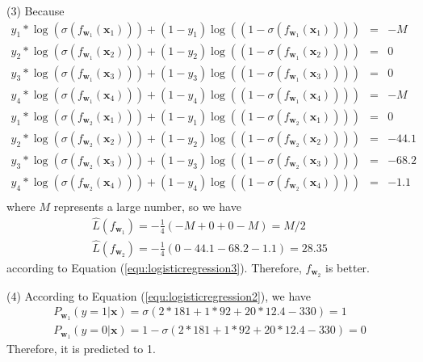 \begin{newanswer*}
(3) Because 
\begin{equation}
\begin{array}{rcl}
    y_1*\log(\sigma(f_{\textbf{w}_1}(\textbf{x}_1)))+(1-y_1)\log((1-\sigma(f_{\textbf{w}_1}(\textbf{x}_1))))&=&-M\\
    y_2*\log(\sigma(f_{\textbf{w}_1}(\textbf{x}_2)))+(1-y_2)\log((1-\sigma(f_{\textbf{w}_1}(\textbf{x}_2))))&=&0\\
    y_3*\log(\sigma(f_{\textbf{w}_1}(\textbf{x}_3)))+(1-y_3)\log((1-\sigma(f_{\textbf{w}_1}(\textbf{x}_3))))&=&0\\
    y_4*\log(\sigma(f_{\textbf{w}_1}(\textbf{x}_4)))+(1-y_4)\log((1-\sigma(f_{\textbf{w}_1}(\textbf{x}_4))))&=&-M\\
    
    y_1*\log(\sigma(f_{\textbf{w}_2}(\textbf{x}_1)))+(1-y_1)\log((1-\sigma(f_{\textbf{w}_2}(\textbf{x}_1))))&=&0\\
    y_2*\log(\sigma(f_{\textbf{w}_2}(\textbf{x}_2)))+(1-y_2)\log((1-\sigma(f_{\textbf{w}_2}(\textbf{x}_2))))&=&-44.1\\
    y_3*\log(\sigma(f_{\textbf{w}_2}(\textbf{x}_3)))+(1-y_3)\log((1-\sigma(f_{\textbf{w}_2}(\textbf{x}_3))))&=&-68.2\\
    y_4*\log(\sigma(f_{\textbf{w}_2}(\textbf{x}_4)))+(1-y_4)\log((1-\sigma(f_{\textbf{w}_2}(\textbf{x}_4))))&=&-1.1\\
\end{array}
\end{equation}
where $M$ represents a large number, so we have  
\begin{equation}
\begin{array}{c}
\hat{L}(f_{\textbf{w}_1}) = -\frac{1}{4}(-M+0+0-M)=M/2\\
\hat{L}(f_{\textbf{w}_2}) = -\frac{1}{4}(0-44.1-68.2-1.1)=28.35
\end{array}
\end{equation}
according to Equation (\ref{equ:logisticregression3}). 
Therefore, $f_{\textbf{w}_2}$ is better. 

(4) According to Equation (\ref{equ:logisticregression2}), we have 
\begin{equation}
\begin{array}{c}
     P_{\textbf{w}_1}(y=1|\textbf{x})=\sigma(2*181+1*92+20*12.4-330)=1 \\
     P_{\textbf{w}_1}(y=0|\textbf{x})=1-\sigma(2*181+1*92+20*12.4-330)=0
\end{array}
\end{equation}
Therefore, it is predicted to 1. 
\end{newanswer*}

